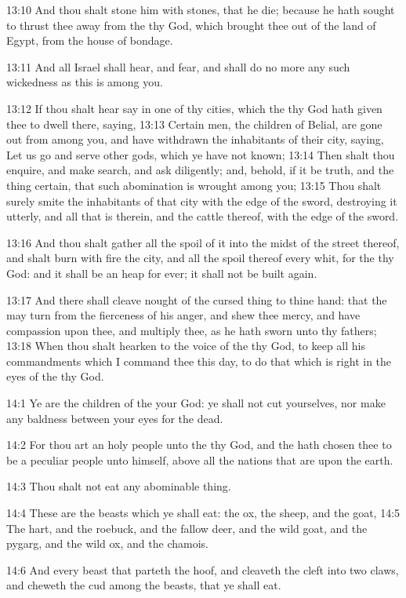 13:10 And thou shalt stone him with stones, that he die; because he
hath sought to thrust thee away from the \LORD thy God, which brought
thee out of the land of Egypt, from the house of bondage.

13:11 And all Israel shall hear, and fear, and shall do no more any
such wickedness as this is among you.

13:12 If thou shalt hear say in one of thy cities, which the \LORD thy
God hath given thee to dwell there, saying, 13:13 Certain men, the
children of Belial, are gone out from among you, and have withdrawn
the inhabitants of their city, saying, Let us go and serve other gods,
which ye have not known; 13:14 Then shalt thou enquire, and make
search, and ask diligently; and, behold, if it be truth, and the thing
certain, that such abomination is wrought among you; 13:15 Thou shalt
surely smite the inhabitants of that city with the edge of the sword,
destroying it utterly, and all that is therein, and the cattle
thereof, with the edge of the sword.

13:16 And thou shalt gather all the spoil of it into the midst of the
street thereof, and shalt burn with fire the city, and all the spoil
thereof every whit, for the \LORD thy God: and it shall be an heap for
ever; it shall not be built again.

13:17 And there shall cleave nought of the cursed thing to thine hand:
that the \LORD may turn from the fierceness of his anger, and shew thee
mercy, and have compassion upon thee, and multiply thee, as he hath
sworn unto thy fathers; 13:18 When thou shalt hearken to the voice of
the \LORD thy God, to keep all his commandments which I command thee
this day, to do that which is right in the eyes of the \LORD thy God.

14:1 Ye are the children of the \LORD your God: ye shall not cut
yourselves, nor make any baldness between your eyes for the dead.

14:2 For thou art an holy people unto the \LORD thy God, and the \LORD
hath chosen thee to be a peculiar people unto himself, above all the
nations that are upon the earth.

14:3 Thou shalt not eat any abominable thing.

14:4 These are the beasts which ye shall eat: the ox, the sheep, and
the goat, 14:5 The hart, and the roebuck, and the fallow deer, and the
wild goat, and the pygarg, and the wild ox, and the chamois.

14:6 And every beast that parteth the hoof, and cleaveth the cleft
into two claws, and cheweth the cud among the beasts, that ye shall
eat.

